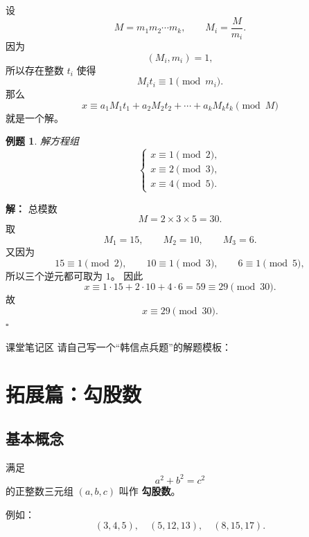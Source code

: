 \documentclass[11pt,a4paper,fontset=fandol]{ctexart}
\theoremstyle{formaltheorem}
\theoremstyle{formalexample}
\newtheorem{example}{例题}[section]
\newenvironment{solution}{\par\noindent\textbf{解：}}{\hfill$\square$\par}
\newcommand{\classblank}{\vspace{2.2cm}}
\begin{document}
设
\[
M=m_1m_2\cdots m_k,\qquad M_i=\frac{M}{m_i}.
\]
因为
\[
(M_i,m_i)=1,
\]
所以存在整数 $t_i$ 使得
\[
M_it_i\equiv 1\pmod{m_i}.
\]
那么
\[
x\equiv a_1M_1t_1+a_2M_2t_2+\cdots+a_kM_kt_k\pmod M
\]
就是一个解。

\begin{example}
解方程组
\[
\begin{cases}
x\equiv 1\pmod 2,\\
x\equiv 2\pmod 3,\\
x\equiv 4\pmod 5.
\end{cases}
\]
\end{example}

\begin{solution}
总模数
\[
M=2\times 3\times 5=30.
\]
取
\[
M_1=15,\qquad M_2=10,\qquad M_3=6.
\]
又因为
\[
15\equiv 1\pmod 2,\qquad 10\equiv 1\pmod 3,\qquad 6\equiv 1\pmod 5,
\]
所以三个逆元都可取为 $1$。
因此
\[
x\equiv 1\cdot 15+2\cdot 10+4\cdot 6=59\equiv 29\pmod{30}.
\]
故
\[
\boxed{x\equiv 29\pmod{30}}.
\]
\end{solution}

\begin{notebox}{课堂笔记区}
请自己写一个“韩信点兵题”的解题模板：
\classblank
\end{notebox}

\section{拓展篇：勾股数}

\subsection{基本概念}

满足
\[
a^2+b^2=c^2
\]
的正整数三元组 $(a,b,c)$ 叫作 \textbf{勾股数}。

例如：
\[
(3,4,5),\quad (5,12,13),\quad (8,15,17).
\]

\begin{center}
\end{center}
\end{document}
